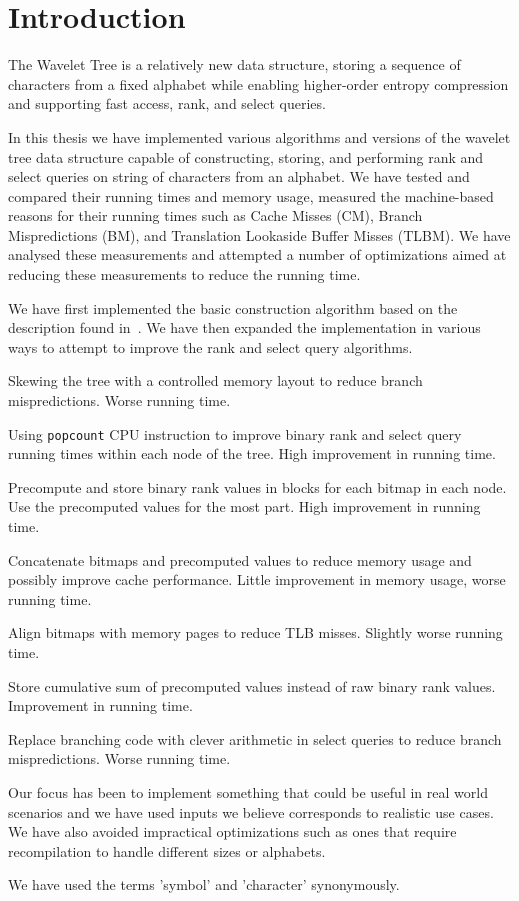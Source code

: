 \section{Introduction}
The Wavelet Tree is a relatively new data structure, storing a sequence of characters from a fixed alphabet while enabling higher-order entropy compression and supporting fast access, rank, and select queries.

In this thesis we have implemented various algorithms and versions of the wavelet tree data structure capable of constructing, storing, and performing rank and select queries on string of characters from an alphabet. We have tested and compared their running times and memory usage, measured the machine-based reasons for their running times such as Cache Misses (CM), Branch Mispredictions (BM), and Translation Lookaside Buffer Misses (TLBM). We have analysed these measurements and attempted a number of optimizations aimed at reducing these measurements to reduce the running time.

We have first implemented the basic construction algorithm based on the description found in~\citep[Section 2]{Navjda13}.
We have then expanded the implementation in various ways to attempt to improve the rank and select query algorithms.
\begin{description*}
\item[Skewing the tree] with a controlled memory layout to reduce branch mispredictions. Worse running time.
\item[Using \texttt{popcount} CPU instruction] to improve binary rank and select query running times within each node of the tree. High improvement in running time.
\item[Precompute and store binary rank values] in blocks for each bitmap in each node. Use the precomputed values for the most part. High improvement in running time.
\item[Concatenate bitmaps and precomputed values] to reduce memory usage and possibly improve cache performance. Little improvement in memory usage, worse running time.
\item[Align bitmaps with memory pages] to reduce TLB misses. Slightly worse running time.
\item[Store cumulative sum of precomputed values] instead of raw binary rank values. Improvement in running time.
\item[Replace branching code with clever arithmetic] in select queries to reduce branch mispredictions. Worse running time.
\end{description*}

Our focus has been to implement something that could be useful in real world scenarios and we have used inputs we believe corresponds to realistic use cases.
We have also avoided impractical optimizations such as ones that require recompilation to handle different sizes or alphabets.

We have used the terms 'symbol' and 'character' synonymously.